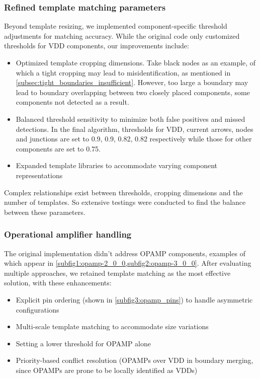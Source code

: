 \documentclass{article}
\begin{document}
\subsubsection{Refined template matching parameters}

Beyond template resizing, we implemented component-specific threshold adjustments for matching accuracy. 
While the original code only customized thresholds for VDD components, our improvements include:

\begin{itemize}
\item Optimized template cropping dimensions. 
Take black nodes as an example, of which a tight cropping may lead to misidentification, as mentioned in \cref{subsec:tight_boundaries_insufficient}.
However, too large a boundary may lead to boundary overlapping between two closely placed components, some components not detected as a result.
\item Balanced threshold sensitivity to minimize both false positives and missed detections. 
In the final algorithm, thresholds for VDD, current arrows, nodes and junctions are set to 0.9, 0.9, 0.82, 0.82 respectively 
while those for other components are set to 0.75.
\item Expanded template libraries to accommodate varying component representations
\end{itemize}

Complex relationships exist between thresholds, cropping dimensions and the number of templates. 
So extensive testings were conducted to find the balance between these parameters.

\subsubsection{Operational amplifier handling}

The original implementation didn't address OPAMP components, examples of which appear in \cref{subfig1:opamp-2_0_0,subfig2:opamp-3_0_0}. 
After evaluating multiple approaches, we retained template matching as the most effective solution, with these enhancements:

\begin{itemize}
\item Explicit pin ordering (shown in \cref{subfig3:opamp_pins}) to handle asymmetric configurations
\item Multi-scale template matching to accommodate size variations
\item Setting a lower threshold for OPAMP alone
\item Priority-based conflict resolution (OPAMPs over VDD in boundary merging, since OPAMPs are prone to be locally identified as VDDs)
\end{itemize}
\end{document}
